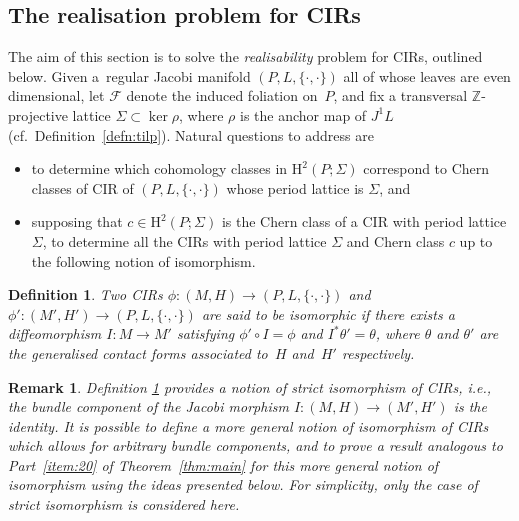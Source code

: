 \documentclass[pdftex]{sigma}
\numberwithin{equation}{section}
\newtheorem{Definition}[Theorem]{Definition}
\newtheorem{Remark}[Theorem]{Remark} }
\newcommand{\JM}{(P,L,\{\cdot,\cdot\})} %
\newcommand{\CM}{(M,H)} %
\newcommand{\HH}{\mathrm{H}}
\newcommand{\ZZ}{\mathbb{Z}}
\begin{document}
\subsection{The realisation problem for CIRs}\label{sec:class-cir-over}
The aim of this section is to solve the {\em realisability} problem for CIRs, outlined below. Given a~regular Jacobi manifold $\JM$ all of whose leaves are even dimensional, let $\mathcal{F}$ denote the induced foliation on~$P$, and f\/ix a transversal $\ZZ$-projective lattice $\Sigma \subset \ker \rho$, where $\rho$ is the anchor map of $J^1L$ (cf.\ Def\/inition~\ref{defn:tilp}). Natural questions to address are
\begin{itemize}\itemsep=0pt
\item to determine which cohomology classes in $\HH^2(P;\Sigma)$ correspond to Chern classes of CIR of $\JM$ whose period lattice is $\Sigma$, and
\item supposing that $c \in \HH^2(P;\Sigma)$ is the Chern class of a CIR with period lattice $\Sigma$, to determine all the CIRs with period lattice $\Sigma$ and Chern class $c$ up to the following notion of isomorphism.
\end{itemize}

\begin{Definition}\label{defn:iso_cir}
Two CIRs $\phi \colon \CM \to \JM$ and $\phi'\colon (M',H') \to \JM$ are said to be {\em isomorphic} if there exists a dif\/feomorphism $I\colon M \to M'$ satisfying $\phi'\circ I = \phi$ and $I^* \theta' = \theta$, where $\theta$ and $\theta'$ are the generalised contact forms associated to~$H$ and~$H'$ respectively.
\end{Definition}

\begin{Remark}\label{rk:strict} Def\/inition \ref{defn:iso_cir} provides a notion of {\em strict} isomorphism of CIRs, i.e., the bundle component of the Jacobi morphism $I \colon \CM \to (M',H')$ is the identity. It is possible to def\/ine a more general notion of isomorphism of CIRs which allows for arbitrary bundle components, and to prove a result analogous to Part~\ref{item:20} of Theorem~\ref{thm:main} for this more general notion of isomorphism using the ideas presented below. For simplicity, only the case of strict isomorphism is considered here.
\end{Remark}
\end{document}
